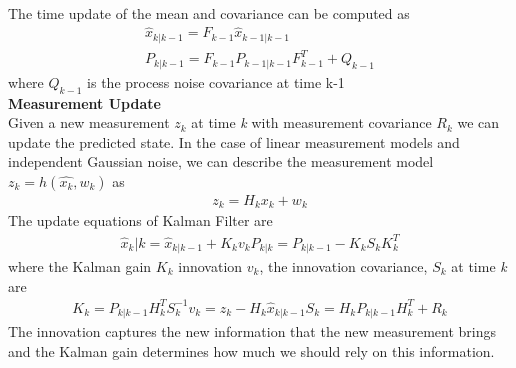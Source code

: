 \begin{itemize}
\begin{align}
                                \end{align}
                                The time update of the mean and covariance can be computed as 
                                \begin{align}
                                    \hat{x}_{k|k-1} = F_{k-1} \hat{x}_{k-1|k-1} \\ 
                                    P_{k|k-1} = F_{k-1} P_{k-1|k-1} F_{k-1}^T + Q_{k-1}
                                \end{align}
                                where \emph{$Q_{k-1}$} is the process noise covariance at time k-1 \\
                            \vspace{3mm}
                             \textbf{Measurement Update} \\ 
                                \vspace{3mm}
                                Given a new measurement \emph{$z_k$} at time \emph{k} with measurement covariance \emph{$R_k$} we can update the predicted state. In the case of linear measurement models and independent Gaussian noise, 
                                we can describe the measurement model \emph{$z_k = h(\hat{x_k}, w_k)$} as
                                \begin{align}
                                    z_k = H_k x_k + w_k
                                \end{align}  
                                The update equations of Kalman Filter are 
                                \begin{align}
                                    \hat{x}_k|k = \hat{x}_{k|k-1} + K_k v_k
                                    P_{k|k} = P_{k|k-1} - K_k S_k K_k^T
                                \end{align}
                                where the Kalman gain \emph{$K_k$} innovation \emph{$v_k$}, the innovation covariance, \emph{$S_k$} at time \emph{k} are
                                \begin{align}
                                    K_k = P_{k|k-1} H_k^T S_k^{-1}
                                    v_k = z_k - H_k \hat{x}_{k|k-1}
                                    S_k = H_k P_{k|k-1} H_k^T + R_k
                                \end{align}
                                The innovation captures the new information that the new measurement brings and the Kalman gain determines how much we should rely on this information.
                            

\end{itemize}
